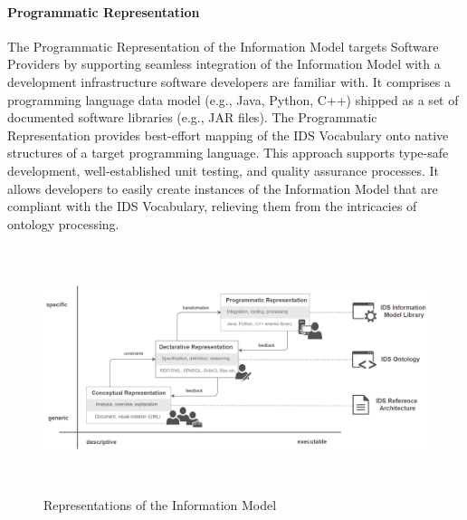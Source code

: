 \paragraph{Programmatic Representation\\}
The Programmatic Representation of the Information Model targets Software Providers by supporting seamless integration of the Information Model with a development infrastructure software developers are familiar with. It comprises a programming language data model (e.g., Java, Python, C++) shipped as a set of documented software libraries (e.g., JAR files). The Programmatic Representation provides best-effort mapping of the IDS Vocabulary onto native structures of a target programming language. This approach supports type-safe development, well-established unit testing, and quality assurance processes. It allows developers to easily create instances of the Information Model that are compliant with the IDS Vocabulary, relieving them from the intricacies of ontology processing.




\begin{figure}[H]
	\begin{Center}
		\includegraphics[width=6.53in,height=2.83in]{./media/image31.png}
		\caption{Representations of the Information Model}
		\label{fig:Representations_of_the_Information_Model}
	\end{Center}
\end{figure}





